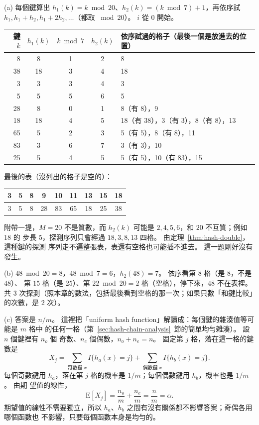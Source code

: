 (a) 每個鍵算出 $h_1(k) = k \bmod 20$、$h_2(k) = (k \bmod 7) + 1$，再依序試
$h_1, h_1 + h_2, h_1 + 2h_2, \ldots$（都取 $\bmod 20$）。 $i$ 從 $0$ 開始。
\begin{center}
\small
\begin{tabular}{rcccl}
\toprule
鍵 $k$ & $h_1(k)$ & $k \bmod 7$ & $h_2(k)$ & 依序試過的格子（最後一個是放進去的位置） \\
\midrule
8 & 8 & 1 & 2 & 8 \\
38 & 18 & 3 & 4 & 18 \\
3 & 3 & 3 & 4 & 3 \\
5 & 5 & 5 & 6 & 5 \\
28 & 8 & 0 & 1 & 8（有 8），9 \\
18 & 18 & 4 & 5 & 18（有 38），3（有 3），8（有 8），13 \\
65 & 5 & 2 & 3 & 5（有 5），8（有 8），11 \\
83 & 3 & 6 & 7 & 3（有 3），10 \\
25 & 5 & 4 & 5 & 5（有 5），10（有 83），15 \\
\bottomrule
\end{tabular}
\end{center}
最後的表（沒列出的格子是空的）：
\begin{center}
\small
\begin{tabular}{*{9}{c}}
\toprule
3 & 5 & 8 & 9 & 10 & 11 & 13 & 15 & 18 \\
\midrule
3 & 5 & 8 & 28 & 83 & 65 & 18 & 25 & 38 \\
\bottomrule
\end{tabular}
\end{center}
附帶一提，$M = 20$ 不是質數，而 $h_2(k)$ 可能是 $2, 4, 5, 6$，和 $20$ 不互質；例如 $18$ 的
步長 $5$，探測序列只會經過 $18, 3, 8, 13$ 四格。 由定理~\ref{thm:hash-double}，這種鍵的探測
序列走不遍整張表，表還有空格也可能插不進去。 這一題剛好沒有發生。

(b) $48 \bmod 20 = 8$，$48 \bmod 7 = 6$，$h_2(48) = 7$。 依序看第 $8$ 格（是 $8$，不是 $48$）、
第 $15$ 格（是 $25$）、第 $22 \bmod 20 = 2$ 格（空格），停下來，$48$ 不在表裡。 共
$3$ 次探測（照本章的數法，包括最後看到空格的那一次；如果只數「和鍵比較」的次數，是 $2$ 次）。

(c) 答案是 $n/m$。 這裡把「uniform hash function」解讀成：每個鍵的雜湊值等可能是 $m$ 格中
的任何一格（第~\ref{sec:hash-chain-analysis}~節的簡單均勻雜湊）。 設 $n$ 個鍵裡有 $n_o$ 個
奇數、$n_e$ 個偶數，$n_o + n_e = n$。 固定第 $j$ 格，落在這一格的鍵數是
\[
X_j = \sum_{\text{奇數鍵 } x} I\{h_a(x) = j\} + \sum_{\text{偶數鍵 } x} I\{h_b(x) = j\}.
\]
每個奇數鍵用 $h_a$，落在第 $j$ 格的機率是 $1/m$；每個偶數鍵用 $h_b$，機率也是 $1/m$。 由期
望值的線性，
\[
\mathrm{E}[X_j] = \frac{n_o}{m} + \frac{n_e}{m} = \frac{n}{m} = \alpha .
\]
期望值的線性不需要獨立，所以 $h_a$、$h_b$ 之間有沒有關係都不影響答案；奇偶各用哪個函數也
不影響，只要每個函數本身是均勻的。

